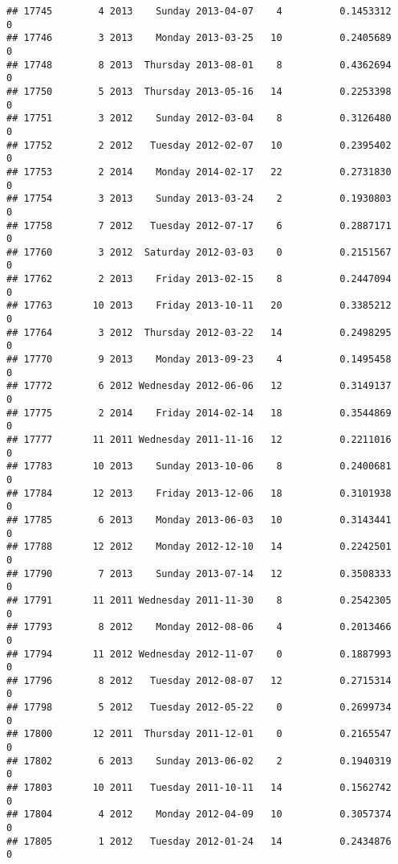 \documentclass[
]{article}
\begin{document}
\begin{verbatim}
## 17745        4 2013    Sunday 2013-04-07    4          0.1453312             0
## 17746        3 2013    Monday 2013-03-25   10          0.2405689             0
## 17748        8 2013  Thursday 2013-08-01    8          0.4362694             0
## 17750        5 2013  Thursday 2013-05-16   14          0.2253398             0
## 17751        3 2012    Sunday 2012-03-04    8          0.3126480             0
## 17752        2 2012   Tuesday 2012-02-07   10          0.2395402             0
## 17753        2 2014    Monday 2014-02-17   22          0.2731830             0
## 17754        3 2013    Sunday 2013-03-24    2          0.1930803             0
## 17758        7 2012   Tuesday 2012-07-17    6          0.2887171             0
## 17760        3 2012  Saturday 2012-03-03    0          0.2151567             0
## 17762        2 2013    Friday 2013-02-15    8          0.2447094             0
## 17763       10 2013    Friday 2013-10-11   20          0.3385212             0
## 17764        3 2012  Thursday 2012-03-22   14          0.2498295             0
## 17770        9 2013    Monday 2013-09-23    4          0.1495458             0
## 17772        6 2012 Wednesday 2012-06-06   12          0.3149137             0
## 17775        2 2014    Friday 2014-02-14   18          0.3544869             0
## 17777       11 2011 Wednesday 2011-11-16   12          0.2211016             0
## 17783       10 2013    Sunday 2013-10-06    8          0.2400681             0
## 17784       12 2013    Friday 2013-12-06   18          0.3101938             0
## 17785        6 2013    Monday 2013-06-03   10          0.3143441             0
## 17788       12 2012    Monday 2012-12-10   14          0.2242501             0
## 17790        7 2013    Sunday 2013-07-14   12          0.3508333             0
## 17791       11 2011 Wednesday 2011-11-30    8          0.2542305             0
## 17793        8 2012    Monday 2012-08-06    4          0.2013466             0
## 17794       11 2012 Wednesday 2012-11-07    0          0.1887993             0
## 17796        8 2012   Tuesday 2012-08-07   12          0.2715314             0
## 17798        5 2012   Tuesday 2012-05-22    0          0.2699734             0
## 17800       12 2011  Thursday 2011-12-01    0          0.2165547             0
## 17802        6 2013    Sunday 2013-06-02    2          0.1940319             0
## 17803       10 2011   Tuesday 2011-10-11   14          0.1562742             0
## 17804        4 2012    Monday 2012-04-09   10          0.3057374             0
## 17805        1 2012   Tuesday 2012-01-24   14          0.2434876             0

\end{verbatim}
\end{document}
